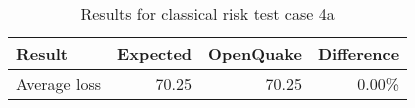 \begin{table}[htbp]

\centering
\begin{tabular}{ l r r r }

\hline
\rowcolor{anti-flashwhite}
\bf{Result} & \bf{Expected} & \bf{OpenQuake} & \bf{Difference}\\
\hline
Average loss & 70.25 & 70.25 & 0.00\% \\
\hline
\end{tabular}

\caption{Results for classical risk test case 4a}
\label{tab:result-cr-4a}
\end{table}